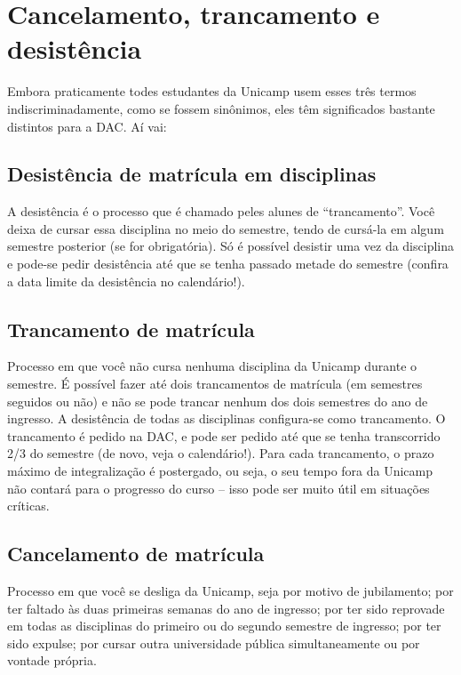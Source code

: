 \section{Cancelamento, trancamento e desistência}

Embora praticamente todes estudantes da Unicamp usem esses três termos
indiscriminadamente, como se fossem sinônimos, eles têm significados bastante
distintos para a DAC. Aí vai:

\subsection{Desistência de matrícula em disciplinas}

A desistência é o processo que é chamado peles alunes de “trancamento”. Você deixa de cursar essa disciplina no meio do semestre, tendo de cursá-la em algum semestre posterior (se for obrigatória). Só é possível desistir uma vez da disciplina e pode-se pedir desistência até que se tenha passado metade do semestre (confira a data limite da desistência no calendário!).

\subsection{Trancamento de matrícula}

Processo em que você não cursa nenhuma disciplina da Unicamp durante o semestre. É possível fazer até dois trancamentos de matrícula (em semestres seguidos ou não) e não se pode trancar nenhum dos dois semestres do ano de ingresso. A desistência de todas as disciplinas configura-se como trancamento. O trancamento é pedido na DAC, e pode ser pedido até que se tenha transcorrido 2/3 do semestre (de novo, veja o calendário!). Para cada trancamento, o prazo máximo de integralização é postergado, ou seja, o seu tempo fora da Unicamp não contará para o progresso do curso – isso pode ser muito útil em situações críticas.

\subsection{Cancelamento de matrícula}

Processo em que você se desliga da Unicamp, seja por motivo de jubilamento; por ter faltado às duas primeiras semanas do ano de ingresso; por ter sido reprovade em todas as disciplinas do primeiro ou do segundo semestre de ingresso; por ter sido expulse; por cursar outra universidade pública simultaneamente ou por vontade própria.


